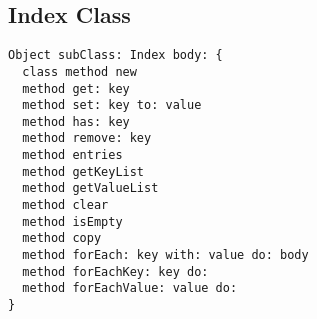 \subsection {Index Class}

\begin{lstlisting}
Object subClass: Index body: {
  class method new
  method get: key
  method set: key to: value
  method has: key
  method remove: key
  method entries
  method getKeyList
  method getValueList
  method clear
  method isEmpty
  method copy
  method forEach: key with: value do: body
  method forEachKey: key do:
  method forEachValue: value do:
}
\end{lstlisting}
